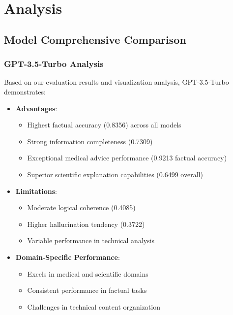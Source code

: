 \section{Analysis}

\subsection{Model Comprehensive Comparison}

\subsubsection{GPT-3.5-Turbo Analysis}
Based on our evaluation results and visualization analysis, GPT-3.5-Turbo demonstrates:
\begin{itemize}
    \item \textbf{Advantages}:
    \begin{itemize}
        \item Highest factual accuracy (0.8356) across all models
        \item Strong information completeness (0.7309)
        \item Exceptional medical advice performance (0.9213 factual accuracy)
        \item Superior scientific explanation capabilities (0.6499 overall)
    \end{itemize}
    \item \textbf{Limitations}:
    \begin{itemize}
        \item Moderate logical coherence (0.4085)
        \item Higher hallucination tendency (0.3722)
        \item Variable performance in technical analysis
    \end{itemize}
    \item \textbf{Domain-Specific Performance}:
    \begin{itemize}
        \item Excels in medical and scientific domains
        \item Consistent performance in factual tasks
        \item Challenges in technical content organization
    \end{itemize}
\end{itemize}

